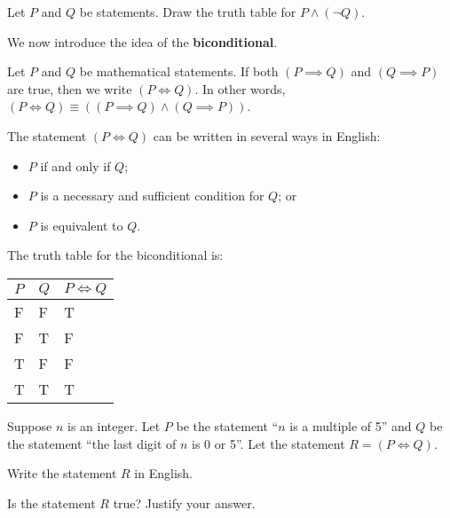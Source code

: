 \begin{exercise}
    Let $P$ and $Q$ be statements. Draw the truth table for $P \land (\lnot Q)$.
\end{exercise}

\newpage

We now introduce the idea of the \textbf{biconditional}.
\begin{definition}
    Let $P$ and $Q$ be mathematical statements. If both $(P \implies Q)$ and $(Q \implies P)$ are true, then we write $(P \iff Q)$. In other words, $(P \iff Q) \equiv ((P \implies Q) \land (Q \implies P))$.
\end{definition}
\begin{remark}
    The statement $(P \iff Q)$ can be written in several ways in English:
    \begin{itemize}
        \item $P$ if and only if $Q$;
        \item $P$ is a necessary and sufficient condition for $Q$; or
        \item $P$ is equivalent to $Q$.
    \end{itemize}
\end{remark}

The truth table for the biconditional is:
\begin{table}[h]
    \centering
    \begin{tabular}{|l|l||l|}
        \hline
        $P$ & $Q$ & $P\iff Q$ \\ \hline
        F   & F   & T         \\ \hline
        F   & T   & F         \\ \hline
        T   & F   & F         \\ \hline
        T   & T   & T         \\ \hline
    \end{tabular}
\end{table}

\begin{exercise}
    Suppose $n$ is an integer. Let $P$ be the statement ``$n$ is a multiple of 5'' and $Q$ be the statement ``the last digit of $n$ is 0 or 5''. Let the statement $R = (P \iff Q)$.
    \begin{partquestions}{\roman*}
        \item Write the statement $R$ in English.
        \item Is the statement $R$ true? Justify your answer.
    \end{partquestions}
\end{exercise}

